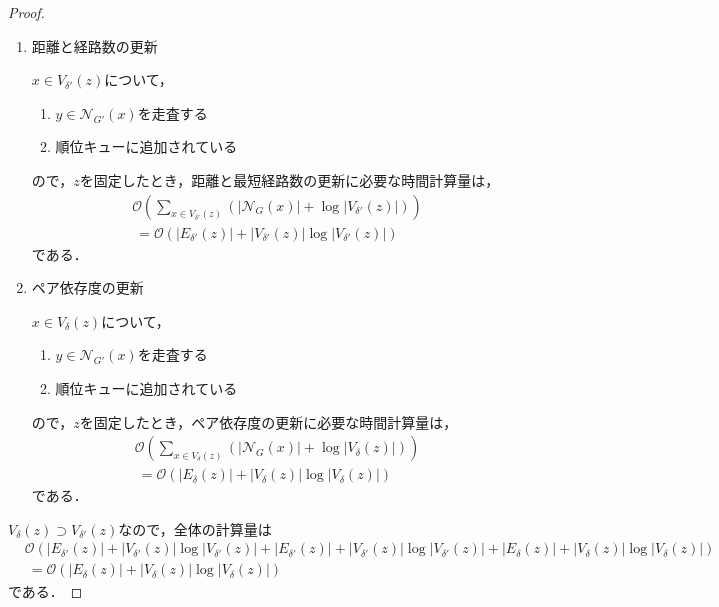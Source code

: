 \begin{proof}
\begin{enumerate}[label=(\alph*)]
  \item 距離と経路数の更新
    \par $x\in V_{\delta'}(z)$について，
    \begin{enumerate}[label=\arabic*.]
    \item $y\in\mathcal{N}_{G'}(x)$を走査する
    \item 順位キューに追加されている
    \end{enumerate}
    ので，$z$を固定したとき，距離と最短経路数の更新に必要な時間計算量は，
    \begin{equation}
      \begin{aligned}
        &\mathcal{O}(\sum_{x\in V_{\delta'}(z)}(\lvert\mathcal{N}_G(x)\rvert
        +\log\lvert V_{\delta'}(z)\rvert)) \nonumber\\
        &\:=\mathcal{O}(\lvert E_{\delta'}(z)\rvert
        +\lvert V_{\delta'}(z)\rvert\log\lvert V_{\delta'}(z)\rvert) \nonumber
      \end{aligned}
    \end{equation}
    である．

  \item ペア依存度の更新
    \par $x\in V_\delta(z)$について，
    \begin{enumerate}[label=\arabic*.]
    \item $y\in\mathcal{N}_{G'}(x)$を走査する
    \item 順位キューに追加されている
    \end{enumerate}
    ので，$z$を固定したとき，ペア依存度の更新に必要な時間計算量は，
    \begin{equation}
      \begin{aligned}
        &\mathcal{O}(\sum_{x\in V_\delta(z)}(\lvert\mathcal{N}_G(x)\rvert
        +\log\lvert V_\delta(z)\rvert)) \nonumber\\
        &\:=\mathcal{O}(\lvert E_\delta(z)\rvert
        +\lvert V_\delta(z)\rvert\log\lvert V_\delta(z)\rvert) \nonumber
      \end{aligned}
    \end{equation}
    である．
  \end{enumerate}
  
  $V_\delta(z)\supset V_{\delta'}(z)$なので，全体の計算量は
  \begin{equation*}
    \begin{aligned}
      &\mathcal{O}(
        \lvert E_{\delta'}(z)\rvert+\lvert V_{\delta'}(z)\rvert\log\lvert V_{\delta'}(z)\rvert
        +\lvert E_{\delta'}(z)\rvert+\lvert V_{\delta'}(z)\rvert\log\lvert V_{\delta'}(z)\rvert
        +\lvert E_\delta(z)\rvert+\lvert V_\delta(z)\rvert\log\lvert V_\delta(z)\rvert
      ) \nonumber\\
      &\:=\mathcal{O}(\lvert E_\delta(z)\rvert+\lvert V_\delta(z)\rvert\log\lvert V_\delta(z)\rvert)
    \end{aligned}
  \end{equation*}
  である．


\end{proof}
